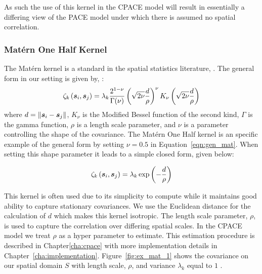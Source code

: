 As such the use of this kernel in the CPACE model will result in essentially a differing view of the PACE model under which there is assumed no spatial correlation.

\subsubsection{Mat\'ern One Half Kernel \label{sssec:matern_one}}
The Mat\'ern kernel is a standard in the spatial statistics literature, \cite{cressie_statistics_2011}.
The general form in our setting is given by, \citep{cressie_statistics_2011}:
\begin{equation}
	\zeta_k\left(\bm{{s}}_{i}, \bm{{s}}_{j}\right) = \lambda_k \frac{2^{1-\nu}}{\Gamma(\nu)}\left(\sqrt{2\nu} \frac{d}{\rho}\right)^\nu K_\nu \left(\sqrt{2\nu} \frac{d}{\rho}\right)
	\label{eqn:gen_mat}
\end{equation}
where $d = \lVert \bm{{s}}_{i} - \bm{{s}}_{j} \rVert$, $K_\nu$ is the Modified Bessel function of the second kind, $\Gamma$ is the gamma function, $\rho$ is a length scale parameter, and $\nu$ is a parameter controlling the shape of the covariance.
The Mat\'ern One Half kernel is an specific example of the general form by setting $\nu=0.5$ in Equation~\ref{eqn:gen_mat}. 
When setting this shape parameter it leads to a simple closed form, given below:

\begin{equation}
	\zeta_k\left(\bm{{s}}_{i}, \bm{{s}}_{j}\right) = \lambda_k \exp \left( -\frac{d}{\rho} \right)
\end{equation}

This kernel is often used due to its simplicity to compute while it maintains good ability to capture stationary covariances.
We use the Euclidean distance for the calculation of $d$ which makes this kernel isotropic.
The length scale parameter, $\rho$, is used to capture the correlation over differing spatial scales.
In the CPACE model we treat $\rho$ as a hyper parameter to estimate.
This estimation procedure is described in Chapter\ref{cha:cpace} with more implementation details in Chapter~\ref{cha:implementation}.
Figure~\ref{fig:ex_mat_1} shows the covariance on our spatial domain $S$ with length scale, $\rho$,  and variance $\lambda_k$ equal to $1$ .


